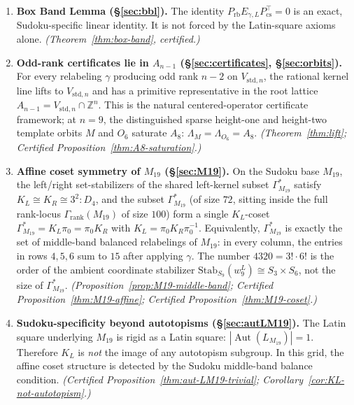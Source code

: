 \documentclass[11pt,a4paper]{article}
\theoremstyle{definition}
\theoremstyle{remark}
\providecommand{\Z}{\mathbb{Z}}
\providecommand{\Aut}{\operatorname{Aut}}
\newcommand{\Vstdn}{V_{\mathrm{std},n}}
\newcommand{\Egamma}{E_{\gamma,L}}
\newcommand{\Prb}{P_{\mathrm{rb}}}
\newcommand{\Pcs}{P_{\mathrm{cs}}}
\newcommand{\GrankM}{\Gamma_{\mathrm{rank}}(M_{19})}
\newcommand{\GMninetn}{\Gamma^{*}_{M_{19}}}     %
\newcommand{\wleftnine}{w^{L}_{9}}
\newcommand{\StabWnine}{\mathrm{Stab}_{S_9}(\wleftnine)}
\newcommand{\KL}{K_L}
\newcommand{\KR}{K_R}
\newcommand{\AffDfour}{3^{2}{:}D_4}
\begin{document}
\begin{enumerate}[label=\textbf{(\alph*)},leftmargin=*]
   \item \textbf{Box Band Lemma (\S\ref{sec:bbl}).} The identity
   $\Prb \Egamma \Pcs^{\!\top} = 0$ is an exact, Sudoku-specific
   linear identity. It is not forced by the Latin-square axioms alone.
   \emph{(Theorem~\ref{thm:box-band}, certified.)}

   \item \textbf{Odd-rank certificates lie in $A_{n-1}$
   (\S\ref{sec:certificates}, \S\ref{sec:orbits}).} For every
   relabeling $\gamma$ producing odd rank $n - 2$ on $\Vstdn$, the
   rational kernel line lifts to $\Vstdn$ and has a primitive
   representative in the root lattice $A_{n-1} = \Vstdn \cap \Z^n$.
   This is the natural centered-operator certificate framework; at
   $n = 9$, the distinguished sparse height-one and height-two template
   orbits $M$ and $O_6$ saturate
   $A_8$:
   $\Lambda_M = \Lambda_{O_6} = A_8$.
   \emph{(Theorem~\ref{thm:lift}; Certified Proposition~\ref{thm:A8-saturation}.)}

   \item \textbf{Affine coset symmetry of $M_{19}$ (\S\ref{sec:M19}).} On
   the Sudoku base $M_{19}$, the left/right set-stabilizers of the
   shared left-kernel subset $\GMninetn$ satisfy
   $\KL \cong \KR \cong \AffDfour$, and
   the subset $\GMninetn$ (of size $72$, sitting inside the
   full rank-locus $\GrankM$ of size $100$) form a single $\KL$-coset
   $\GMninetn = \KL \pi_0 = \pi_0 \KR$ with $\KL = \pi_0 \KR
   \pi_0^{-1}$. Equivalently, $\GMninetn$ is exactly the set of
   middle-band balanced relabelings of $M_{19}$: in every column, the
   entries in rows $4,5,6$ sum to $15$ after applying $\gamma$. The
   number $4320 = 3!\cdot 6!$ is the order of the
   ambient coordinate stabilizer $\StabWnine \cong S_3 \times S_6$, not
   the size of $\GMninetn$.
   \emph{(Proposition~\ref{prop:M19-middle-band};
   Certified Proposition~\ref{thm:M19-affine};
   Certified Proposition~\ref{thm:M19-coset}.)}

   \item \textbf{Sudoku-specificity beyond autotopisms
   (\S\ref{sec:autLM19}).} The Latin square underlying $M_{19}$ is
   rigid as a Latin square: $|\Aut(L_{M_{19}})| = 1$. Therefore $\KL$
   is \emph{not} the image of any autotopism subgroup. In this grid,
   the affine coset structure is detected by the Sudoku middle-band
   balance condition.
   \emph{(Certified Proposition~\ref{thm:aut-LM19-trivial};
        Corollary~\ref{cor:KL-not-autotopism}.)}
\end{enumerate}
\end{document}
